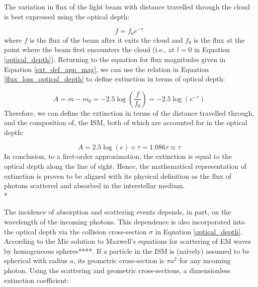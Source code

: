 \documentclass[12pt, a4paper]{report}
\begin{document}
The variation in flux of the light beam with distance travelled through the cloud is best expressed using the optical depth:

\begin{equation}
f = f_{0} e^{-\tau}
\label{flux_loss_optical_depth}
\end{equation}
where $f$ is the flux of the beam after it exits the cloud and $f_{0}$ is the flux at the point where the beam first encounters the cloud (i.e., at $l = 0$ in Equation \ref{optical_depth}). Returning to the equation for flux magnitudes given in Equation \ref{ext_def_app_mag}, we can use the relation in Equation \ref{flux_loss_optical_depth} to define extinction in terms of optical depth:

\begin{equation}
A = m - m_{0} = -2.5\log\left(\frac{f}{f_{0}}\right) = -2.5\log(e^{-\tau})
\label{ext_optical_depth_mags}
\end{equation}
Therefore, we can define the extinction in terms of the distance travelled through, and the composition of, the ISM, both of which are accounted for in the optical depth:

\begin{equation}
A = 2.5\log(e) \times \tau = 1.086\tau \approx \tau
\label{ext_optical_depth}
\end{equation}
In conclusion, to a first-order approximation, the extinction is equal to the optical depth along the line of sight. Hence, the mathematical representation of extinction is proven to be aligned with its physical definition as the flux of photons scattered and absorbed in the interstellar medium. \\*

The incidence of absorption and scattering events depends, in part, on the wavelength of the incoming photons. This dependence is also incorporated into the optical depth via the collision cross-section $\sigma$ in Equation \ref{optical_depth}. According to the Mie solution \citep{1908AnP...330..377M} to Maxwell's equations for scattering of EM waves by homogeneous spheres****. If a particle in the ISM is (naively) assumed to be spherical with radius $a$, its geometric cross-section is $\pi a^{2}$ for any incoming photon. Using the scattering and geometric cross-sections, a dimensionless extinction coefficient:
\end{document}
